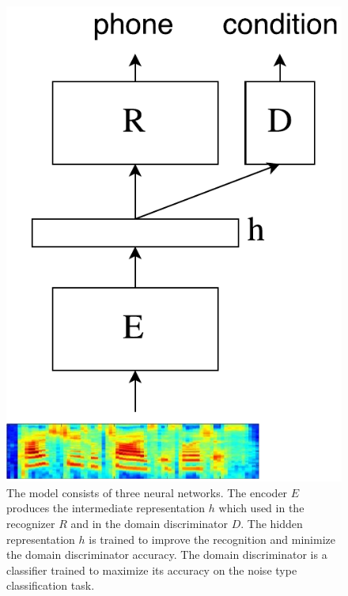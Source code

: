 \documentclass[a4paper]{article}
\begin{document}
\begin{figure}[t]
    \centering

    \centering
        \includegraphics[width=0.4\linewidth]{model.pdf}
        \caption{The model consists of three neural networks. The encoder $E$ produces
        the intermediate representation $h$ which used in the recognizer $R$ and 
        in the domain discriminator $D$. The hidden representation $h$ is trained to improve
        the recognition and minimize the domain discriminator accuracy. The domain discriminator
        is a classifier trained to maximize its accuracy on the noise type
        classification task.}
        \label{fig:model}
\end{figure}
\end{document}
